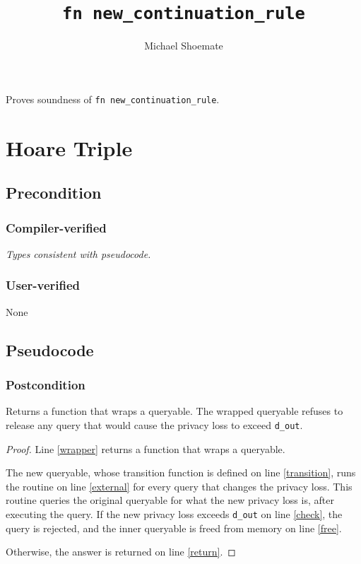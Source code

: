 \documentclass{article}
\title{\texttt{fn new\_continuation\_rule}}
\author{Michael Shoemate}
\date{}
\begin{document}
\maketitle

\contrib
Proves soundness of \texttt{fn new\_continuation\_rule}.

\section{Hoare Triple}
\subsection*{Precondition}
\subsubsection*{Compiler-verified}
\textit{Types consistent with pseudocode.}
\subsubsection*{User-verified}
None

\subsection*{Pseudocode}


\subsubsection*{Postcondition}
\begin{theorem}
    Returns a function that wraps a queryable.
    The wrapped queryable refuses to release any query
    that would cause the privacy loss to exceed \texttt{d\_out}.
\end{theorem}

\begin{proof}
    Line \ref{wrapper} returns a function that wraps a queryable.
    
    The new queryable, whose transition function is defined on line \ref{transition},
    runs the routine on line \ref{external} for every query that changes the privacy loss.
    This routine queries the original queryable for what the new privacy loss is,
    after executing the query.
    If the new privacy loss exceeds \texttt{d\_out} on line \ref{check},
    the query is rejected, and the inner queryable is freed from memory on line \ref{free}.

    Otherwise, the answer is returned on line \ref{return}.
\end{proof}
\end{document}
